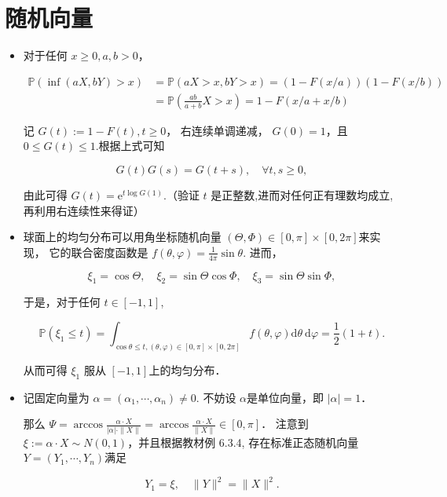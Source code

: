 \section{随机向量}
\begin{itemize}
  
\item[4．]

对于任何  $x \geq 0, a, b>0  $，

\begin{align}
\mathbb{P}(\inf (a X, b Y)>x) & =\mathbb{P}(a X>x, b Y>x)=(1-F(x / a))(1-F(x / b)) \\
& =\mathbb{P}\left(\frac{a b}{a+b} X>x\right)=1-F(x / a+x / b)
\end{align}

记  $G(t):=1-F(t), t \geq 0$，
右连续单调递减， $G(0)=1$，且  $0 \leq G(t) \leq 1$.根据上式可知

$$G(t) G(s)=G(t+s), \quad \forall t, s \geq 0,$$

由此可得  $G(t)=\mathrm{e}^{t \log G(1)} $.（验证  $t$  是正整数,进而对任何正有理数均成立,再利用右连续性来得证）

\item[13．]

球面上的均匀分布可以用角坐标随机向量  $(\Theta, \Phi) \in[0, \pi] \times[0,2 \pi]$来实现，
它的联合密度函数是  $f(\theta, \varphi)=\frac{1}{4 \pi} \sin \theta  $.
进而，

$$\xi_{1}=\cos \Theta, \quad \xi_{2}=\sin \Theta \cos \Phi, \quad \xi_{3}=\sin \Theta \sin \Phi,$$

于是，对于任何  $t \in[-1,1]$,

$$\mathbb{P}\left(\xi_{1} \leq t\right)=\int_{\cos \theta \leq t,(\theta, \varphi) \in[0, \pi] \times[0,2 \pi]} f(\theta, \varphi) \mathrm{d} \theta \mathrm{~d} \varphi=\frac{1}{2}(1+t).$$

从而可得 $\xi_{1}$  服从  $[-1,1]$上的均匀分布．

\item[22.]

记固定向量为  $\alpha=\left(\alpha_{1}, \cdots, \alpha_{n}\right) \neq 0  $.
不妨设 $\alpha$是单位向量，即  $|\alpha|=1$．

那么  $\Psi=\arccos \frac{\alpha \cdot X}{|\alpha| \cdot\|X\|}=\arccos \frac{\alpha \cdot X}{\|X\|} \in[0, \pi]$．
注意到  $\xi:=\alpha \cdot X\sim N(0,1)$，并且根据教材例 6.3.4, 存在标准正态随机向量  $Y=\left(Y_{1}, \cdots, Y_{n}\right) $满足

$$Y_{1}=\xi, \quad\|Y\|^{2}=\|X\|^{2}. $$


\end{itemize}
